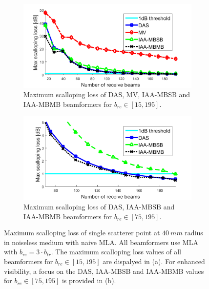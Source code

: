 \begin{figure}[ht]
    \centering
    \begin{subfigure}[t]{\linewidth}
        \includegraphics[width=\linewidth]{./images/results/4/loss_vs_beams_mla.png}
        \caption{Maximum scalloping loss of DAS, MV, IAA-MBSB and IAA-MBMB beamformers for $b_{re} \in [15, 195]$.}
    \end{subfigure}
    \quad
    \begin{subfigure}[t]{\linewidth}
        \includegraphics[width=\linewidth]{./images/results/4/loss_vs_beams_mla_zoom.png}
        \caption{Maximum scalloping loss of DAS, IAA-MBSB and IAA-MBMB beamformers for $b_{re} \in [75, 195]$.}
    \end{subfigure}
	\caption[Maximum scalloping loss of single scatterer point at $40~mm$ radius in noiseless medium with naive MLA.]{Maximum scalloping loss of single scatterer point at $40~mm$ radius in noiseless medium with naive MLA. All beamformers use MLA with $b_{re} = 3 \cdot b_{tr}$. The maximum scalloping loss values of all beamformers for $b_{re} \in [15, 195]$ are dispalyed in (a). For enhanced visibility, a focus on the DAS, IAA-MBSB and IAA-MBMB values for $b_{re} \in [75, 195]$ is provided in (b).}
	\label{fig:loss_vs_beams_mla}
\end{figure}


